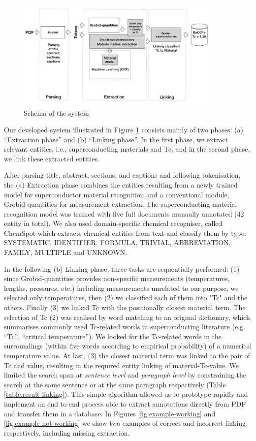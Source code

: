 \documentclass{article}[a4]
\begin{document}
\begin{figure}[]
    \centering
    \includegraphics[width=4in]{schema}
    \caption[Schema of the system] {Schema of the system}
    \label{fig:system-schema}
\end{figure}

Our developed system illustrated in Figure \ref{fig:system-schema} consists mainly of two phases: (a) “Extraction phase” and (b) “Linking phase”. In the first phase, we extract relevant entities, i.e., superconducting materials and Tc, and in the second phase, we link these extracted entities.

After parsing title, abstract, sections, and captions and following tokenisation, the (a) Extraction phase combines the entities resulting from a newly trained model for superconductor material recognition and a conventional module, Grobid-quantities for measurement extraction. The superconducting material recognition model was trained with five full documents manually annotated (42 entity in total). We also used domain-specific chemical recogniser, called ChemSpot \cite{10.1093/bioinformatics/bts183} which extracts chemical entities from text and classify them by type: SYSTEMATIC, IDENTIFIER, FORMULA, TRIVIAL, ABBREVIATION, FAMILY, MULTIPLE and UNKNOWN.

In the following (b) Linking phase, three tasks are sequentially performed: (1) since Grobid-quantities provides non-specific measurements (temperatures, lengths, pressures, etc.) including measurements unrelated to our purpose, we selected only temperatures, then (2) we classified each of them into "Tc" and the others. Finally (3) we linked Tc with the positionally closest material term. 
The selection of Tc (2) was realised by word matching to an original dictionary, which summarises commonly used Tc-related words in superconducting literature (e.g. “Tc”, “critical temperature”). We looked for the Tc-related words in the surroundings (within five words according to empirical probability) of a numerical temperature value. 
At last, (3) the closest material term was linked to the pair of Tc and value, resulting in the required entity linking of material-Tc-value. We limited the search span at \textit{sentence level} and \textit{paragraph level} by constraining the search at the same sentence or at the same paragraph respectively (Table \ref{table:result-linking}).
This simple algorithm allowed us to prototype rapidly and implement an end to end process able to extract annotations directly from PDF and transfer them in a database. In Figures \ref{fig:example-working} and \ref{fig:example-not-working} we show two examples of correct and incorrect linking respectively, including missing extraction. 
\end{document}

